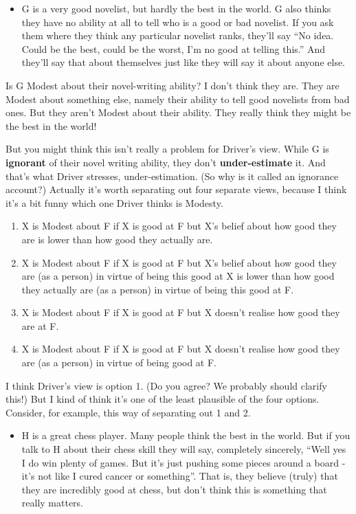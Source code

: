 \documentclass[
]{article}
\providecommand{\tightlist}{%
  \setlength{\itemsep}{0pt}\setlength{\parskip}{0pt}}
\begin{document}
\begin{itemize}
\tightlist
\item
  G is a very good novelist, but hardly the best in the world. G also
  thinks they have no ability at all to tell who is a good or bad
  novelist. If you ask them where they think any particular novelist
  ranks, they'll say ``No idea. Could be the best, could be the worst,
  I'm no good at telling this.'' And they'll say that about themselves
  just like they will say it about anyone else.
\end{itemize}

Is G Modest about their novel-writing ability? I don't think they are.
They are Modest about something else, namely their ability to tell good
novelists from bad ones. But they aren't Modest about their ability.
They really think they might be the best in the world!

But you might think this isn't really a problem for Driver's view. While
G is \textbf{ignorant} of their novel writing ability, they don't
\textbf{under-estimate} it. And that's what Driver stresses,
under-estimation. (So why is it called an ignorance account?) Actually
it's worth separating out four separate views, because I think it's a
bit funny which one Driver thinks is Modesty.

\begin{enumerate}
\def\labelenumi{\arabic{enumi}.}
\tightlist
\item
  X is Modest about F if X is good at F but X's belief about how good
  they are is lower than how good they actually are.
\item
  X is Modest about F if X is good at F but X's belief about how good
  they are (as a person) in virtue of being this good at X is lower than
  how good they actually are (as a person) in virtue of being this good
  at F.
\item
  X is Modest about F if X is good at F but X doesn't realise how good
  they are at F.
\item
  X is Modest about F if X is good at F but X doesn't realise how good
  they are (as a person) in virtue of being good at F.
\end{enumerate}

I think Driver's view is option 1. (Do you agree? We probably should
clarify this!) But I kind of think it's one of the least plausible of
the four options. Consider, for example, this way of separating out 1
and 2.

\begin{itemize}
\tightlist
\item
  H is a great chess player. Many people think the best in the world.
  But if you talk to H about their chess skill they will say, completely
  sincerely, ``Well yes I do win plenty of games. But it's just pushing
  some pieces around a board - it's not like I cured cancer or
  something''. That is, they believe (truly) that they are incredibly
  good at chess, but don't think this is something that really matters.
\end{itemize}
\end{document}
